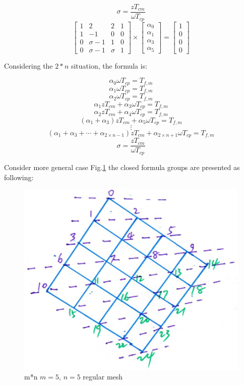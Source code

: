 $$\sigma = \frac{zT_{cm}}{\omega T_{cp}}$$
\begin{equation}
{
\left[ \begin{array}{cccc}
1 & 2 & 2 & 1\\
1 & -1 & 0 & 0\\
0 & \sigma-1 & 1 & 0\\
0 & \sigma-1 & \sigma & 1
\end{array} 
\right ]} \times \left[ \begin{array}{c}
\alpha_{0} \\
\alpha_{1} \\
\alpha_{3} \\
\alpha_{5}
\end{array} 
\right ] = \left[ \begin{array}{c}
1 \\
0 \\
0 \\
0
\end{array} 
\right ]
\end{equation}

\vspace*{50pt}

Considering the $2*n$ situation, the formula is:


$$\alpha_{0} \omega T_{cp} = T_{f,m}$$ 
$$\alpha_{1} \omega T_{cp} = T_{f,m}$$
$$\alpha_{2} \omega T_{cp} = T_{f,m}$$
$$\alpha_{1}zT_{cm} + \alpha_{3}\omega T_{cp} = T_{f,m}$$
$$\alpha_{2}zT_{cm} + \alpha_{4}\omega T_{cp} = T_{f,m}$$
$$(\alpha_{1} + \alpha_{3})zT_{cm} + \alpha_{5}\omega T_{cp} = T_{f,m}$$
$$\vdots$$
$$(\alpha_{1} + \alpha_{3} +\cdots + \alpha_{2 \times n - 1})zT_{cm} +\alpha_{2 \times n + 1} \omega T_{cp} = T_{f,m}$$
$$\sigma = \frac{zT_{cm}}{\omega T_{cp}}$$

\vspace*{50pt}


\vspace*{80pt}


\vspace*{50pt}
Consider more general case Fig.\ref{410f} the closed formula groups are presented as following:

\begin{figure}[h]
\centering\includegraphics[width=0.7\linewidth]{figure/c410_f}
\caption{m*n $m = 5$, $n = 5$ regular mesh}
\label{410f}
\end{figure}


